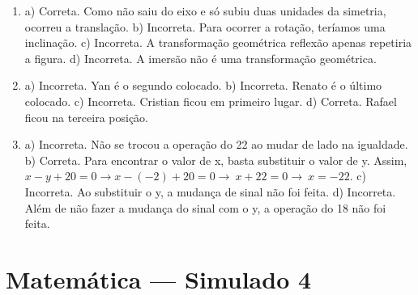 \begin{enumerate}
\item a) Correta. Como não saiu do eixo e só subiu duas unidades da simetria, ocorreu a translação.
b) Incorreta. Para ocorrer a rotação, teríamos uma inclinação.
c) Incorreta. A transformação geométrica reflexão apenas repetiria a figura.
d) Incorreta. A imersão não é uma transformação geométrica.

\item a) Incorreta. Yan é o segundo colocado.
b) Incorreta. Renato é o último colocado.
c) Incorreta. Cristian ficou em primeiro lugar.
d) Correta. Rafael ficou na terceira posição.


\item a) Incorreta. Não se trocou a operação do 22 ao mudar de lado na igualdade.
b) Correta. Para encontrar o valor de x, basta substituir o valor
de y. Assim, $x - y + 20 = 0 \rightarrow x - ( - 2) + 20 = 0 \rightarrow \ x + 22 = 0 \rightarrow \ x = - 22$.
c) Incorreta. Ao substituir o y, a mudança de sinal não foi feita.
d) Incorreta. Além de não fazer a mudança do sinal com o y, a operação do 18 não foi feita.
\end{enumerate}

\section*{Matemática — Simulado 4} 

